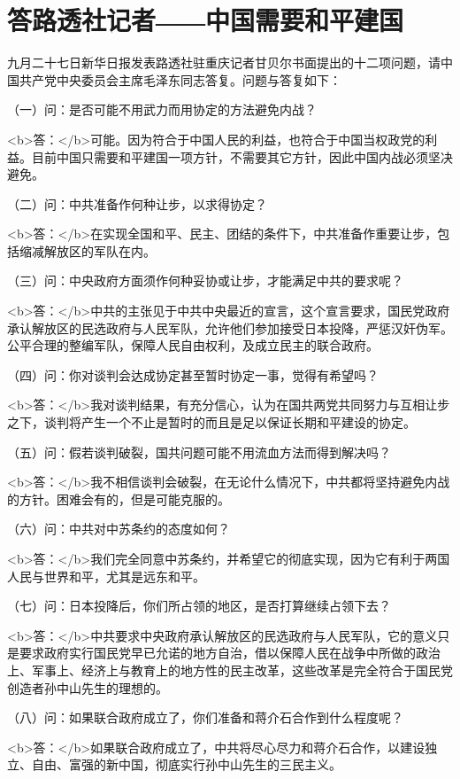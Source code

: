 \section[答路透社记者――中国需要和平建国（一九四五年九月十二日）]{答路透社记者――中国需要和平建国}


九月二十七日新华日报发表路透社驻重庆记者甘贝尔书面提出的十二项问题，请中国共产党中央委员会主席毛泽东同志答复。问题与答复如下：

（一）问：是否可能不用武力而用协定的方法避免内战？

<b>答：</b>可能。因为符合于中国人民的利益，也符合于中国当权政党的利益。目前中国只需要和平建国一项方针，不需要其它方针，因此中国内战必须坚决避免。

（二）问：中共准备作何种让步，以求得协定？

<b>答：</b>在实现全国和平、民主、团结的条件下，中共准备作重要让步，包括缩减解放区的军队在内。

（三）问：中央政府方面须作何种妥协或让步，才能满足中共的要求呢？

<b>答：</b>中共的主张见于中共中央最近的宣言，这个宣言要求，国民党政府承认解放区的民选政府与人民军队，允许他们参加接受日本投降，严惩汉奸伪军。公平合理的整编军队，保障人民自由权利，及成立民主的联合政府。

（四）问：你对谈判会达成协定甚至暂时协定一事，觉得有希望吗？


<b>答：</b>我对谈判结果，有充分信心，认为在国共两党共同努力与互相让步之下，谈判将产生一个不止是暂时的而且是足以保证长期和平建设的协定。

（五）问：假若谈判破裂，国共问题可能不用流血方法而得到解决吗？

<b>答：</b>我不相信谈判会破裂，在无论什么情况下，中共都将坚持避免内战的方针。困难会有的，但是可能克服的。

（六）问：中共对中苏条约的态度如何？

<b>答：</b>我们完全同意中苏条约，并希望它的彻底实现，因为它有利于两国人民与世界和平，尤其是远东和平。

（七）问：日本投降后，你们所占领的地区，是否打算继续占领下去？

<b>答：</b>中共要求中央政府承认解放区的民选政府与人民军队，它的意义只是要求政府实行国民党早已允诺的地方自治，借以保障人民在战争中所做的政治上、军事上、经济上与教育上的地方性的民主改革，这些改革是完全符合于国民党创造者孙中山先生的理想的。

（八）问：如果联合政府成立了，你们准备和蒋介石合作到什么程度呢？

<b>答：</b>如果联合政府成立了，中共将尽心尽力和蒋介石合作，以建设独立、自由、富强的新中国，彻底实行孙中山先生的三民主义。

